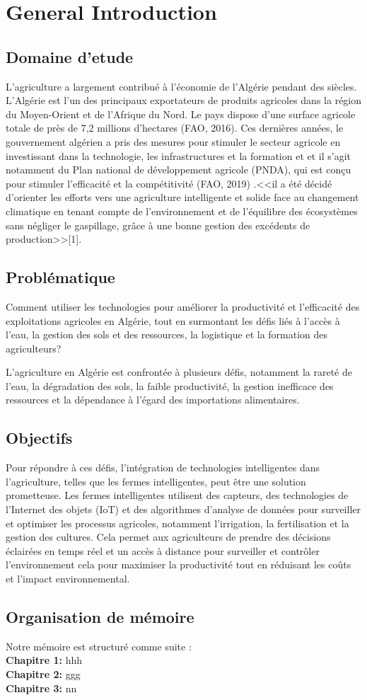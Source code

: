\chapter*{General Introduction} 
\label{chap:introduction} 


\section*{Domaine d'etude}

L'agriculture a largement contribué à l'économie de l'Algérie pendant des siècles. L'Algérie est l'un des principaux exportateurs de produits agricoles dans la région du Moyen-Orient et de l'Afrique du Nord. Le pays dispose d'une surface agricole totale de près de 7,2 millions d'hectares  (FAO, 2016).
Ces dernières années, le gouvernement algérien a pris des mesures pour stimuler le secteur agricole en investissant dans la technologie, les infrastructures et la formation et et il s'agit notamment du Plan national de développement agricole (PNDA), qui est conçu pour stimuler l'efficacité et la compétitivité (FAO, 2019) .<<il a été décidé d’orienter les efforts vers une agriculture intelligente et solide face au changement climatique en tenant compte de l’environnement et de l’équilibre des écosystèmes sans négliger le gaspillage, grâce à une bonne gestion des excédents de production>>[1].


\section*{Problématique }
Comment utiliser les technologies pour améliorer la productivité et l'efficacité des exploitations agricoles en Algérie, tout en surmontant les défis liés à l'accès à l'eau, la gestion des sols et des ressources, la logistique et la formation des agriculteurs?

L'agriculture en Algérie est confrontée à plusieurs défis, notamment la rareté de l'eau, la dégradation des sols, la faible productivité, la gestion inefficace des ressources et la dépendance à l'égard des importations alimentaires. 

\section*{Objectifs }
Pour répondre à ces défis, l'intégration de technologies intelligentes dans l'agriculture, telles que les fermes intelligentes, peut être une solution prometteuse. Les fermes intelligentes utilisent des capteurs, des technologies de l'Internet des objets (IoT) et des algorithmes d'analyse de données pour surveiller et optimiser les processus agricoles, notamment l'irrigation, la fertilisation et la gestion des cultures. Cela permet aux agriculteurs de prendre des décisions éclairées en temps réel et un accès à distance pour surveiller et contrôler l’environnement cela pour maximiser la productivité tout en réduisant les coûts et l'impact environnemental.


\section*{Organisation de mémoire }
Notre mémoire est structuré comme suite : 
\\
\textbf{Chapitre 1: }
hhh
\\
\textbf{Chapitre 2: }
ggg
\\
\textbf{Chapitre 3: }
nn
